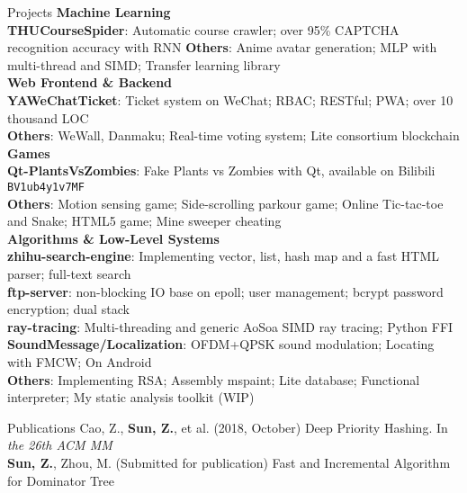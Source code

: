 \documentclass{resume}
\begin{document}
\begin{rSection}{Projects}
\hspace*{-0.2in}\textbf{Machine Learning} \\
\textbf{THUCourseSpider}: Automatic course crawler; over 95\% CAPTCHA recognition accuracy with RNN
\textbf{Others}: Anime avatar generation; MLP with multi-thread and SIMD; Transfer learning library \\
\hspace*{-0.2in}\textbf{Web Frontend \& Backend} \\
\textbf{YAWeChatTicket}: Ticket system on WeChat; RBAC; RESTful; PWA; over 10 thousand LOC \\
\textbf{Others}: WeWall, Danmaku; Real-time voting system; Lite consortium blockchain \\
\hspace*{-0.2in}\textbf{Games} \\
\textbf{Qt-PlantsVsZombies}: Fake Plants vs Zombies with Qt, available on Bilibili \texttt{BV1ub4y1v7MF} \\
\textbf{Others}: Motion sensing game; Side-scrolling parkour game; Online Tic-tac-toe and Snake; HTML5 game; Mine sweeper cheating \\
\hspace*{-0.2in}\textbf{Algorithms \& Low-Level Systems} \\
\textbf{zhihu-search-engine}: Implementing vector, list, hash map and a fast HTML parser; full-text search \\
\textbf{ftp-server}: non-blocking IO base on epoll; user management; bcrypt password encryption; dual stack \\
\textbf{ray-tracing}: Multi-threading and generic AoSoa SIMD ray tracing; Python FFI \\
\textbf{SoundMessage/Localization}: OFDM+QPSK sound modulation; Locating with FMCW; On Android \\
\textbf{Others}: Implementing RSA; Assembly mspaint; Lite database; Functional interpreter; My static analysis toolkit (WIP)
\end{rSection}

\begin{rSection}{Publications}
Cao, Z., \textbf{Sun, Z.}, et al. (2018, October) Deep Priority Hashing. In \textit{the 26th ACM MM} \\
\textbf{Sun, Z.}, Zhou, M. (Submitted for publication) Fast and Incremental Algorithm for Dominator Tree
\end{rSection}
\end{document}
